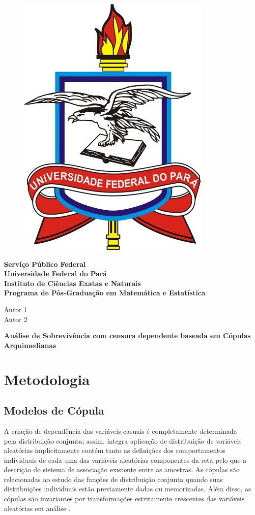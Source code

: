 \documentclass[11pt, a4paper]{article}
\begin{document}
\renewcommand{\refname}{}
\begin{figure}
    \centering
    \includegraphics[width=0.12\linewidth]{IconUFPA.png}
    \label{fig:my_label}
    
\end{figure} 

{
\begin{center}
\vspace{0,1cm}\textbf{Serviço Público Federal}\\
\vspace{0,1cm}\textbf{Universidade Federal do Pará}\\
\vspace{0,1cm}\textbf{Instituto de Ciências Exatas e Naturais}\\
\vspace{0,1cm}\textbf{Programa de Pós-Graduação em Matemática e Estatística}
\end{center}
}

{
\begin{center}

Autor 1\\
Autor 2\\
\end{center}
}
{
\begin{center}

\textbf{Análise de Sobrevivência com censura dependente baseada em Cópulas\\Arquimedianas}
\end{center}
}


\section{Metodologia}


\subsection{Modelos de Cópula}
A criação de dependência das variáveis casuais é completamente determinada pela distribuição conjunta; assim, íntegra aplicação de distribuição de variáveis aleatórias implicitamente contém tanto as definições dos comportamentos individuais de cada uma das variáveis aleatórias componentes da reta pelo que a descrição do sistema de associação existente entre as amostras. As cópulas são relacionadas ao estudo das funções de distribuição conjunta quando suas distribuições individuais estão previamente dadas ou memorizadas. Além disso, as cópulas são invariantes por transformações estritamente crescentes das variáveis aleatórias em análise \cite{lopes18}.
\end{document}
